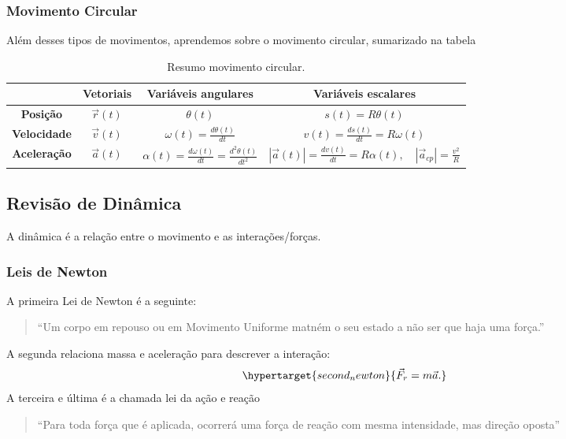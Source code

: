 \documentclass[PhysicsI/physics_notes.tex]{subfiles}
\begin{document}
\subsubsection{Movimento Circular}
Além desses tipos de movimentos, aprendemos sobre o movimento circular, sumarizado na tabela
\begin{table}[h!]
	\centering
	\begin{tabular}{|c|c|c|c|}
		\hline
		                    & \textbf{Vetoriais} & \textbf{Variáveis angulares}                                    & \textbf{Variáveis escalares}                                                        \\
		\hline
		\textbf{Posição}    & $\vec{r}(t)$       & $\theta(t)$                                                     & $s(t) = R\theta(t)$                                                                 \\
		\hline
		\textbf{Velocidade} & $\vec{v}(t)$       & $\omega(t) = \frac{d \theta(t)}{dt}$                            & $v(t) = \frac{d s(t)}{dt} = R\omega(t)$                                             \\
		\hline
		\textbf{Aceleração} & $\vec{a}(t)$       & $\alpha(t) = \frac{d\omega(t)}{dt} = \frac{d^2\theta(t)}{dt^2}$ & $|\vec{a}(t)| = \frac{dv(t)}{dt} = R\alpha(t),\quad |\vec{a}_{cp}| = \frac{v^2}{R}$ \\
		\hline
	\end{tabular}
	\caption{Resumo movimento circular.}
	\label{Resumo2MCU}
\end{table}

\subsection{Revisão de Dinâmica}
A dinâmica é a relação entre o movimento e as interações/forças.
\subsubsection{Leis de Newton}
A primeira Lei de Newton é a seguinte:
\begin{quote}
	\hypertarget{first_newton}{``Um corpo em repouso ou em Movimento Uniforme matném o seu estado a não ser que haja uma força.''}
\end{quote}
A segunda relaciona massa e aceleração para descrever a interação:
$$
	\hypertarget{second_newton}{\vec{F}_{r} = m \vec{a}.}
$$
A terceira e última é a chamada lei da ação e reação
\begin{quote}
	\hypertarget{third_newton}{``Para toda força que é aplicada, ocorrerá uma força de reação com mesma intensidade, mas direção oposta''}
\end{quote}
\end{document}
